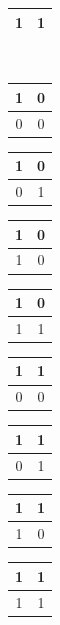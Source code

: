 \begin{center}
\begin{tabular}{|c|c|}
     1&1\\\hline
\end{tabular}\hspace{0.5cm}\\\vspace{0.3cm}
\begin{tabular}{|c|c|}\hline
     1&0\\\hline
     0&0\\\hline
\end{tabular}\hspace{0.5cm}
\begin{tabular}{|c|c|}\hline
     1&0\\\hline
     0&1\\\hline
\end{tabular}\hspace{0.5cm}
\begin{tabular}{|c|c|}\hline
     1&0\\\hline
     1&0\\\hline
\end{tabular}\hspace{0.5cm}
\begin{tabular}{|c|c|}\hline
     1&0\\\hline
     1&1\\\hline
\end{tabular}\hspace{0.5cm}
\begin{tabular}{|c|c|}\hline
     1&1\\\hline
     0&0\\\hline
\end{tabular}\hspace{0.5cm}
\begin{tabular}{|c|c|}\hline
     1&1\\\hline
     0&1\\\hline
\end{tabular}\hspace{0.5cm}
\begin{tabular}{|c|c|}\hline
     1&1\\\hline
     1&0\\\hline
\end{tabular}\hspace{0.5cm}
\begin{tabular}{|c|c|}\hline
     1&1\\\hline
     1&1\\\hline
\end{tabular}
\end{center}

